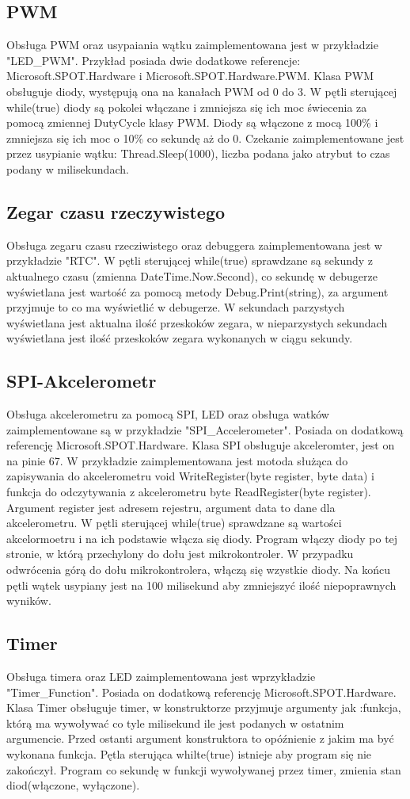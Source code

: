 ﻿\documentclass{article}
\begin{document}
\subsection{PWM}
Obsługa PWM oraz usypaiania wątku zaimplementowana jest w przykładzie "LED\_PWM". Przykład posiada dwie dodatkowe referencje: Microsoft.SPOT.Hardware i Microsoft.SPOT.Hardware.PWM. Klasa PWM obsługuje diody, występują ona na kanałach PWM od 0 do 3. W pętli sterującej while(true) diody są pokolei włączane i zmniejsza się ich moc świecenia za pomocą zmiennej DutyCycle klasy PWM. Diody są włączone z mocą 100\% i zmniejsza się ich moc o 10\% co sekundę aż do 0. Czekanie zaimplementowane jest przez usypianie wątku: Thread.Sleep(1000), liczba podana jako atrybut to czas podany w milisekundach.

\subsection{Zegar czasu rzeczywistego}
Obsługa zegaru czasu rzecziwistego oraz debuggera zaimplementowana jest w przykładzie "RTC". W pętli sterującej while(true) sprawdzane są sekundy z aktualnego czasu (zmienna DateTime.Now.Second), co sekundę w debugerze wyświetlana jest wartość za pomocą metody Debug.Print(string), za argument przyjmuje to co ma wyświetlić w debugerze. W sekundach parzystych wyświetlana jest aktualna ilość przeskoków zegara, w nieparzystych sekundach wyświetlana jest ilość przeskoków zegara wykonanych w ciągu sekundy.

\subsection{SPI-Akcelerometr}
Obsługa akcelerometru za pomocą SPI, LED oraz obsługa watków zaimplementowane są w przykładzie "SPI\_Accelerometer". Posiada on dodatkową referencję Microsoft.SPOT.Hardware. Klasa SPI obsługuje akceleromter, jest on na pinie 67. W przykładzie zaimplementowana jest motoda służąca do zapisywania do akcelerometru  void WriteRegister(byte register, byte data) i funkcja do odczytywania z akcelerometru byte ReadRegister(byte register). Argument register jest adresem rejestru, argument data to dane dla akcelerometru. W pętli sterującej while(true) sprawdzane są wartości akcelormoetru i na ich podstawie włącza się diody. Program włączy diody po tej stronie, w którą przechylony do dołu jest mikrokontroler. W przypadku odwrócenia górą do dołu mikrokontrolera, włączą się wzystkie diody. Na końcu pętli wątek usypiany jest na 100 milisekund aby zmniejszyć ilość niepoprawnych wyników. 

\subsection{Timer}
Obsługa timera oraz LED zaimplementowana jest wprzykładzie "Timer\_Function". Posiada on dodatkową referencję Microsoft.SPOT.Hardware. Klasa Timer obsługuje timer, w konstruktorze przyjmuje argumenty jak :funkcja, którą ma wywoływać co tyle milisekund ile jest podanych w ostatnim argumencie. Przed ostanti argument konstruktora to opóźnienie z jakim ma być wykonana funkcja. Pętla sterująca whilte(true) {} istnieje aby program się nie zakończył. Program co sekundę w funkcji wywoływanej przez timer, zmienia stan diod(włączone, wyłączone).
\end{document}
